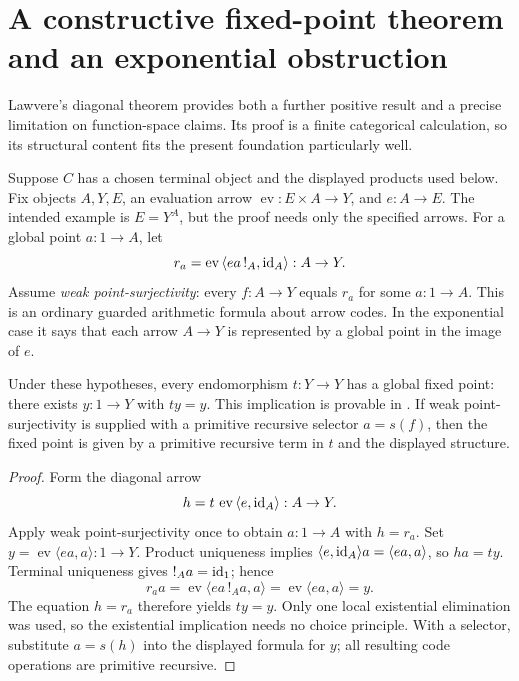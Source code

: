 \section{A constructive fixed-point theorem and an exponential obstruction}
\label{sec:lawvere}

Lawvere's diagonal theorem \cite{lawvere} provides both a further positive
result and a precise limitation on function-space claims.  Its proof is a
finite categorical calculation, so its structural content fits the present
foundation particularly well.

Suppose $C$ has a chosen terminal object and the displayed products used
below.  Fix objects $A,Y,E$, an evaluation arrow
$\operatorname{ev}:E\times A\to Y$, and $e:A\to E$.
The intended example is $E=Y^A$, but the proof needs only the specified
arrows.  For a global point $a:1\to A$, let
\[
 r_a=\operatorname{ev}\,\langle e a\,!_A,\operatorname{id}_A\rangle:A\to Y.
\]
Assume \emph{weak point-surjectivity}: every $f:A\to Y$ equals $r_a$ for
some $a:1\to A$.  This is an ordinary guarded arithmetic formula about
arrow codes.  In the exponential case it says that each arrow $A\to Y$
is represented by a global point in the image of $e$.

\begin{theorem}\label{thm:lawvere}
Under these hypotheses, every endomorphism $t:Y\to Y$ has a global fixed
point: there exists $y:1\to Y$ with $ty=y$.  This implication is provable
in \ipra.  If weak point-surjectivity is supplied with a primitive recursive
selector $a=s(f)$, then the fixed point is given by a primitive recursive
term in $t$ and the displayed structure.
\end{theorem}
\begin{proof}
Form the diagonal arrow
\[
 h=t\,\operatorname{ev}\,\langle e,\operatorname{id}_A\rangle:A\to Y.
\]
Apply weak point-surjectivity once to obtain $a:1\to A$ with $h=r_a$.
Set $y=\operatorname{ev}\langle ea,a\rangle:1\to Y$.
Product uniqueness implies
$\langle e,\operatorname{id}_A\rangle a=\langle ea,a\rangle$, so $ha=ty$.
Terminal uniqueness gives $!_A a=\operatorname{id}_1$; hence
\[
 r_a a
 =\operatorname{ev}\langle ea\,!_A a,a\rangle
 =\operatorname{ev}\langle ea,a\rangle=y.
\]
The equation $h=r_a$ therefore yields $ty=y$.  Only one local existential
elimination was used, so the existential implication needs no choice
principle.  With a selector, substitute $a=s(h)$ into the displayed formula
for $y$; all resulting code operations are primitive recursive.
\end{proof}


